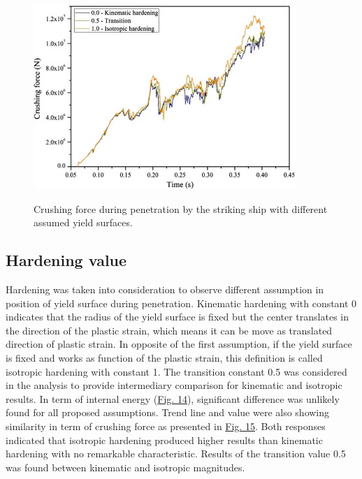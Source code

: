 \documentclass[../Final.tex]{subfiles}
\begin{document}
\begin{figure}[ht]
    \centering
    \includegraphics[width=\columnwidth]{fig15.jpg}
    \label{fig15}
    \caption{Crushing force during penetration by the striking ship with different assumed yield surfaces.}
\end{figure}

\subsection{Hardening value}

Hardening was taken into consideration to observe different assumption in position of yield surface during penetration. 
Kinematic hardening with constant 0 indicates that the radius of the yield surface is fixed but the center translates in the direction of the plastic strain, which means it can be move as translated direction of plastic strain. 
In opposite of the first assumption, if the yield surface is fixed and works as function of the plastic strain, this definition is called isotropic hardening with constant 1. 
The transition constant 0.5 was considered in the analysis to provide intermediary comparison for kinematic and isotropic results. 
In term of internal energy (\hyperref[fig14]{Fig. 14}), significant difference was unlikely found for all proposed assumptions. Trend line and value were also showing similarity in term of crushing force as presented in \hyperref[fig15]{Fig. 15}. 
Both responses indicated that isotropic hardening produced higher results than kinematic hardening with no remarkable characteristic. Results of the transition value 0.5 was found between kinematic and isotropic magnitudes. 
\end{document}
